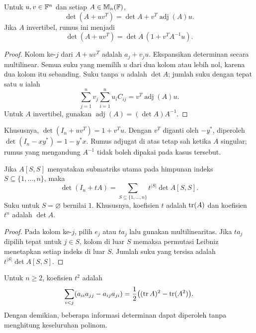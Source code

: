 \begin{thm}
      \label{det:rankone}
      Untuk $u,v\in\mathbb{F}^n$ dan setiap $A\in\mathbb{M}_n(\mathbb{F})$,
      \[
            \boxed{\det(A+uv^T)=\det A+v^T\operatorname{adj}(A)u.}
      \]
      Jika $A$ invertibel, rumus ini menjadi
      \[
            \det(A+uv^T)=\det A\,(1+v^TA^{-1}u).
      \]
\end{thm}
\begin{proof}
      Kolom ke-$j$ dari $A+uv^T$ adalah $a_j+v_ju$.
      Ekspansikan determinan secara multilinear. Semua suku yang memilih
      $u$ dari dua kolom atau lebih nol, karena dua kolom itu sebanding.
      Suku tanpa $u$ adalah $\det A$; jumlah suku dengan tepat satu $u$ ialah
      \[
            \sum_{j=1}^n v_j\sum_{i=1}^n u_iC_{ij}
            =v^T\operatorname{adj}(A)u.
      \]
      Untuk $A$ invertibel, gunakan
      $\operatorname{adj}(A)=(\det A)A^{-1}$.
\end{proof}

Khususnya, $\det(I_n+uv^T)=1+v^Tu$. Dengan $v^T$ diganti oleh
$-y^*$, diperoleh $\det(I_n-xy^*)=1-y^*x$. Rumus adjugat di atas tetap sah
ketika $A$ singular; rumus yang mengandung $A^{-1}$ tidak boleh
dipakai pada kasus tersebut.

\begin{prop}
      \label{det:principal}
      Jika $A[S,S]$ menyatakan submatriks utama pada himpunan indeks
      $S\subseteq\{1,\ldots,n\}$, maka
      \[
            \det(I_n+tA)=\sum_{S\subseteq\{1,\ldots,n\}}
            t^{|S|}\det A[S,S].
      \]
      Suku untuk $S=\varnothing$ bernilai $1$. Khususnya, koefisien $t$
      adalah $\operatorname{tr}(A)$ dan koefisien $t^n$ adalah $\det A$.
\end{prop}
\begin{proof}
      Pada kolom ke-$j$, pilih $e_j$ atau $ta_j$ lalu gunakan multilinearitas.
      Jika $ta_j$ dipilih tepat untuk $j\in S$, kolom di luar $S$ memaksa
      permutasi Leibniz menetapkan setiap indeks di luar $S$.
      Jumlah suku yang tersisa adalah $t^{|S|}\det A[S,S]$.
\end{proof}

Untuk $n\ge2$, koefisien $t^2$ adalah
\[
      \sum_{i<j}(a_{ii}a_{jj}-a_{ij}a_{ji})
      =\frac12\bigl((\operatorname{tr} A)^2-\operatorname{tr}(A^2)\bigr).
\]
Dengan demikian, beberapa informasi determinan dapat diperoleh tanpa
menghitung keseluruhan polinom.

